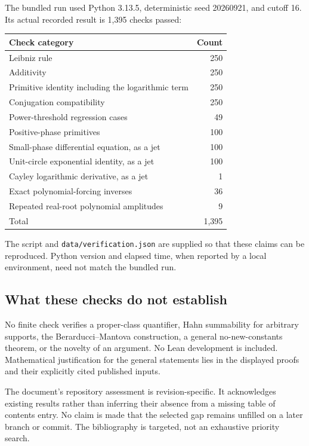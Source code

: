 \documentclass[11pt,a4paper]{article}
\numberwithin{equation}{section}
\theoremstyle{definition}
\theoremstyle{remark}
\begin{document}
The bundled run used Python 3.13.5, deterministic seed 20260921, and cutoff
16. Its actual recorded result is 1,395 checks passed:
\begin{center}\small
\begin{tabularx}{\textwidth}{@{}Yr@{}}
\toprule
Check category & Count\\
\midrule
Leibniz rule & 250\\
Additivity & 250\\
Primitive identity including the logarithmic term & 250\\
Conjugation compatibility & 250\\
Power-threshold regression cases & 49\\
Positive-phase primitives & 100\\
Small-phase differential equation, as a jet & 100\\
Unit-circle exponential identity, as a jet & 100\\
Cayley logarithmic derivative, as a jet & 1\\
Exact polynomial-forcing inverses & 36\\
Repeated real-root polynomial amplitudes & 9\\
\midrule
Total & 1,395\\
\bottomrule
\end{tabularx}
\end{center}
The script and \texttt{data/verification.json} are supplied so that these
claims can be reproduced. Python version and elapsed time, when reported
by a local environment, need not match the bundled run.

\subsection{What these checks do not establish}
No finite check verifies a proper-class quantifier, Hahn summability for
arbitrary supports, the Berarducci--Mantova construction, a general
no-new-constants theorem, or the novelty of an argument. No Lean development
is included. Mathematical justification for the general statements lies
in the displayed proofs and their explicitly cited published inputs.

The document's repository assessment is revision-specific. It acknowledges
existing results rather than inferring their absence from a missing table
of contents entry. No claim is made that the selected gap remains unfilled
on a later branch or commit. The bibliography is targeted, not an exhaustive
priority search.
\end{document}
